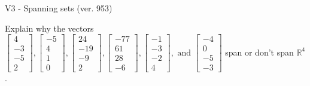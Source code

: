 \begin{exercise}
  \begin{exerciseTitle}V3 - Spanning sets (ver. 953)\end{exerciseTitle}
  \begin{exerciseStatement}
    Explain why the vectors \(\left[\begin{array}{r}
4 \\
-3 \\
-5 \\
2
\end{array}\right] , \left[\begin{array}{r}
-5 \\
4 \\
1 \\
0
\end{array}\right] , \left[\begin{array}{r}
24 \\
-19 \\
-9 \\
2
\end{array}\right] , \left[\begin{array}{r}
-77 \\
61 \\
28 \\
-6
\end{array}\right] , \left[\begin{array}{r}
-1 \\
-3 \\
-2 \\
4
\end{array}\right] , \text{ and } \left[\begin{array}{r}
-4 \\
0 \\
-5 \\
-3
\end{array}\right]\) span or don't span \(\mathbb{R}^4\). 
	



\end{exerciseStatement}
\end{exercise}
